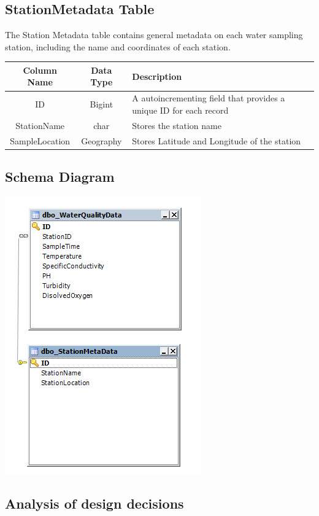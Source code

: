 \documentclass[a4paper]{article}
\begin{document}
\begin{minipage}[t]{0.45\textwidth}
\subsection{StationMetadata Table}
The Station Metadata table contains general metadata on each water sampling station, including the name and coordinates of each station.
\begin{center}
\begin{tabular} { | c | c | p{3.2cm} |}
\hline
{\scriptsize Column Name} & {\scriptsize Data Type} & {\scriptsize Description }\\
\hline
{\scriptsize ID} & {\scriptsize Bigint } &{\scriptsize A autoincrementing field that provides a unique ID for each record } \\
\hline
{\scriptsize StationName} & {\scriptsize char} & {\scriptsize Stores the station name} \\
\hline
{\scriptsize SampleLocation} & {\scriptsize Geography} & {\scriptsize Stores Latitude and Longitude of the station}  \\
\hline
\end{tabular}
\end{center}
\subsection{Schema Diagram}
\includegraphics{schema.jpg}

\subsection{Analysis of design decisions}
\end{minipage}
\end{document}
